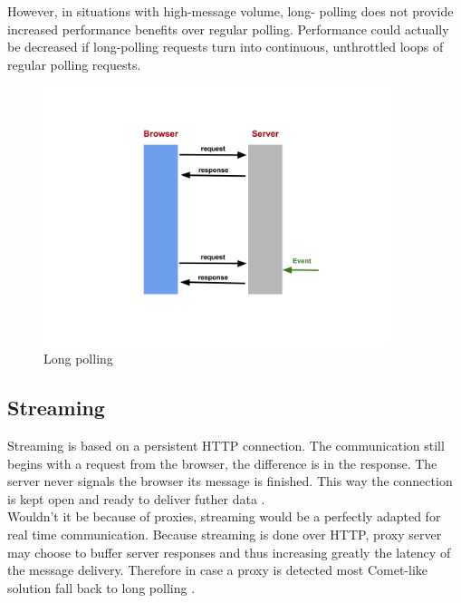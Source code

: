 However, in situations with high-message volume, long- polling does not provide
increased performance benefits over regular polling. Performance could actually
be decreased if long-polling requests turn into continuous, unthrottled loops
of regular polling requests.\\

\begin{figure}[H]
\centering
\includegraphics[width=0.9\textwidth]{./Figures/long_polling.png}
\caption[longPolling]{Long polling}
\label{fig:long_polling}
\end{figure}

\subsection{Streaming}

Streaming is based on a persistent HTTP connection. The communication still
begins with a request from the browser, the difference is in the response. The
server never signals the browser its message is finished. This way the
connection is kept open and ready to deliver futher data \citep{Reference2}.\\

Wouldn't it be because of proxies, streaming would be a perfectly adapted for
real time communication. Because streaming is done over HTTP, proxy server may
choose to buffer server responses and thus increasing greatly the latency of
the message delivery. Therefore in case a proxy is detected most Comet-like
solution fall back to long polling \citep{Reference2}.\\


